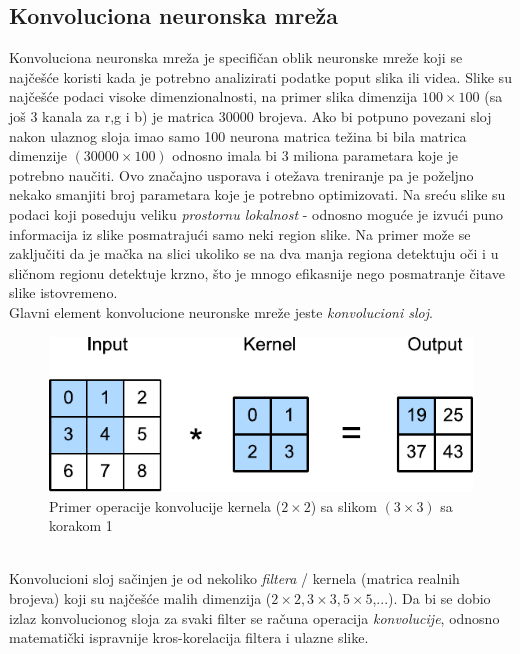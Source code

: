 \documentclass[a4paper,fleqn,12pt]{JMThesis}
\theoremstyle{plain}
\theoremstyle{definition}
\theoremstyle{definition}
\begin{document}
\subsection{Konvoluciona neuronska mreža}
Konvoluciona neuronska mreža je specifičan oblik neuronske mreže koji se najčešće koristi kada je potrebno analizirati podatke
poput slika ili videa. Slike su najčešće podaci visoke dimenzionalnosti, na primer slika dimenzija $100 \times 100$ (sa još 3 kanala
za r,g i b) je matrica 30000 brojeva. Ako bi potpuno povezani sloj nakon ulaznog sloja imao samo 100 neurona matrica težina bi bila
matrica dimenzije $(30000 \times 100)$ odnosno imala bi 3 miliona parametara koje je potrebno naučiti. Ovo značajno usporava i otežava
treniranje pa je poželjno nekako smanjiti broj parametara koje je potrebno optimizovati. Na sreću slike su podaci koji poseduju
veliku \textit{prostornu lokalnost} - odnosno moguće je izvući puno informacija iz slike posmatrajući samo neki region slike.
Na primer može se zaključiti da je mačka na slici ukoliko se na dva manja regiona detektuju oči i u sličnom regionu detektuje
krzno, što je mnogo efikasnije nego posmatranje čitave slike istovremeno. \\
Glavni element konvolucione neuronske mreže jeste \textit{konvolucioni sloj}.
\begin{figure}[!ht]
	\centering
    \includegraphics{../graph-visuals/convolution-example.pdf}
	\caption{Primer operacije konvolucije kernela ($2 \times 2$) sa slikom $(3 \times 3)$ sa korakom 1}
\end{figure}\\
Konvolucioni sloj sačinjen je od nekoliko \textit{filtera} / kernela (matrica realnih brojeva) koji su najčešće malih dimenzija ($2\times 2,3 \times 3,5 \times 5$,...).
Da bi se dobio izlaz konvolucionog sloja za svaki filter se računa operacija \textit{konvolucije}, odnosno matematički ispravnije
kros-korelacija filtera i ulazne slike.
\end{document}
